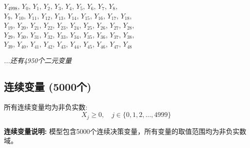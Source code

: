 \documentclass[a4paper,10pt]{article}
\begin{document}
{\small
$Y_{4998}$, $Y_{0}$, $Y_{1}$, $Y_{2}$, $Y_{3}$, $Y_{4}$, $Y_{5}$, $Y_{6}$, $Y_{7}$, $Y_{8}$, \\
$Y_{9}$, $Y_{10}$, $Y_{11}$, $Y_{12}$, $Y_{13}$, $Y_{14}$, $Y_{15}$, $Y_{16}$, $Y_{17}$, $Y_{18}$, \\
$Y_{19}$, $Y_{20}$, $Y_{21}$, $Y_{22}$, $Y_{23}$, $Y_{24}$, $Y_{25}$, $Y_{26}$, $Y_{27}$, $Y_{28}$, \\
$Y_{29}$, $Y_{30}$, $Y_{31}$, $Y_{32}$, $Y_{33}$, $Y_{34}$, $Y_{35}$, $Y_{36}$, $Y_{37}$, $Y_{38}$, \\
$Y_{39}$, $Y_{40}$, $Y_{41}$, $Y_{42}$, $Y_{43}$, $Y_{44}$, $Y_{45}$, $Y_{46}$, $Y_{47}$, $Y_{48}$

\textit{...还有4950个二元变量}
}

\subsection{连续变量 (5000个)}

所有连续变量均为非负实数:
\begin{equation}
X_j \geq 0, \quad j \in \{0, 1, 2, \ldots, 4999\}
\end{equation}

\textbf{连续变量说明:} 模型包含5000个连续决策变量，所有变量的取值范围均为非负实数域。
\end{document}
